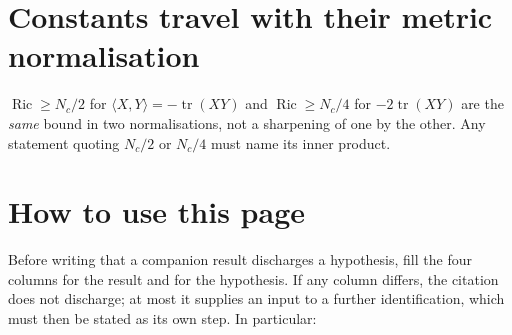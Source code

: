 \documentclass[11pt]{article}
\begin{document}
\section*{Constants travel with their metric normalisation}

$\operatorname{Ric}\ge N_c/2$ for $\langle X,Y\rangle=-\operatorname{tr}(XY)$ and
$\operatorname{Ric}\ge N_c/4$ for $-2\operatorname{tr}(XY)$ are the \emph{same} bound
in two normalisations, not a sharpening of one by the other. Any statement quoting
$N_c/2$ or $N_c/4$ must name its inner product.

\section*{How to use this page}

Before writing that a companion result discharges a hypothesis, fill the four columns
for the result and for the hypothesis. If any column differs, the citation does not
discharge; at most it supplies an input to a further identification, which must then
be stated as its own step. In particular:
\end{document}
